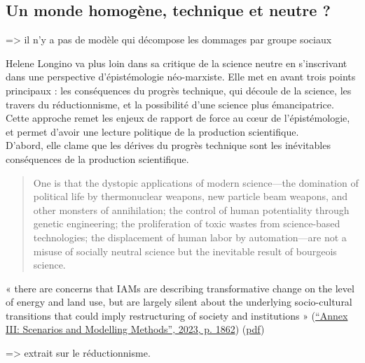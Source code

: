 \subsection{Un monde homogène, technique et neutre ?}

=> il n'y a pas de modèle qui décompose les dommages par groupe sociaux

Helene Longino va plus loin dans sa critique de la science neutre en s'inscrivant dans une perspective d'épistémologie néo-marxiste. Elle met en avant trois points principaux : les conséquences du progrès technique, qui découle de la science, les travers du réductionnisme, et la possibilité d'une science plus émancipatrice. Cette approche remet les enjeux de rapport de force au cœur de l'épistémologie, et permet d'avoir une lecture politique de la production scientifique. \\

D'abord, elle clame que les dérives du progrès technique sont les inévitables conséquences de la production scientifique. 

\begin{quote}
    One is that the dystopic applications of modern science—the domination of political life by thermonuclear weapons, new particle beam weapons, and other monsters of annihilation; the control of human potentiality through genetic engineering; the proliferation of toxic wastes from science-based technologies; the displacement of human labor by automation—are not a misuse of socially neutral science but the inevitable result of bourgeois science.
\end{quote}

« there are concerns that IAMs are describing transformative change on the level of energy and land use, but are largely silent about the underlying socio-cultural transitions that could imply restructuring of society and institutions » (\href{zotero://select/library/items/2SDDNUUF}{“Annex III: Scenarios and Modelling Methods”, 2023, p. 1862}) (\href{zotero://open-pdf/library/items/CHVFSLLH?page=22&annotation=JY4VBIZY}{pdf})



=> extrait sur le réductionnisme.

